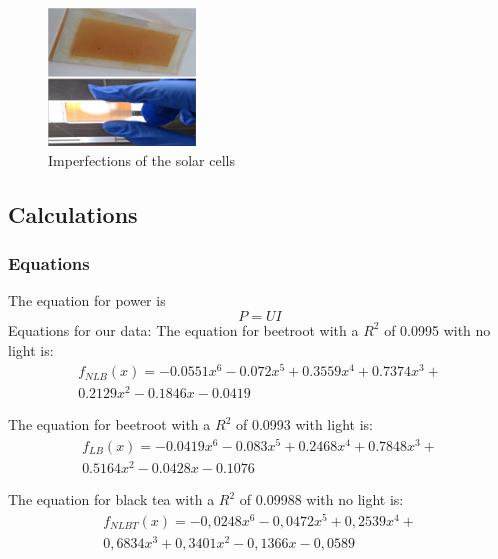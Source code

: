 \documentclass[conference]{IEEEtran}
\begin{document}
\begin{figure}[H]
\centering
\includegraphics[width=0.35\textwidth]{img/combined.png}
\caption{Imperfections of the solar cells}
\label{fig:resultteabeet} %
\end{figure}
\subsection{Calculations}

\subsubsection{Equations}
The equation for power is \begin{equation} \label{eq:power} P = UI \end{equation}
Equations for our data:
The equation for beetroot with a $R^2$ of 0.0995 with no light is: 
\begin{equation} \label{eq:redbeetnolighteq} 
\begin{aligned}
f_{NLB}(x) = -0.0551x^6 - 0.072x^5 + 0.3559x^4 + 0.7374x^3 +\\ 0.2129x^2 -0.1846x - 0.0419
\end{aligned}
\end{equation}

\noindent The equation for beetroot with a $R^2$ of 0.0993 with light is: 
\begin{equation} \label{eq:redbeetlighteq}
\begin{aligned}
f_{LB}(x) = -0.0419x^6 - 0.083x^5 + 0.2468x^4 + 0.7848x^3 +\\ 0.5164x^2 - 0.0428x - 0.1076
\end{aligned}
\end{equation}

\noindent The equation for black tea with a $R^2$ of 0.09988 with no light is: 
\begin{equation} \label{eq:blackteanolighteq} 
\begin{aligned}
f_{NLBT}(x) = -0,0248x^6 - 0,0472x^5 + 0,2539x^4 + \\0,6834x^3 + 0,3401x^2 - 0,1366x - 0,0589
\end{aligned}
\end{equation}
\end{document}
